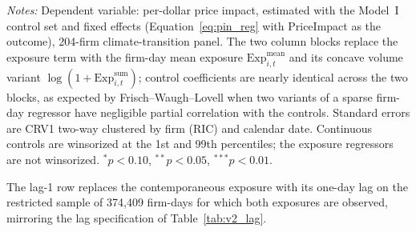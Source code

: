 \begin{table}[htbp]
\begin{threeparttable}
\begin{tablenotes}
\small
\item \textit{Notes:} Dependent variable: per-dollar price impact, estimated with the Model~I control set and fixed effects (Equation~\ref{eq:pin_reg} with PriceImpact as the outcome), 204-firm climate-transition panel. The two column blocks replace the exposure
term with the firm-day mean exposure $\mathrm{Exp}^{\text{mean}}_{i,t}$ and its
concave volume variant $\log(1+\mathrm{Exp}^{\text{sum}}_{i,t})$; control
coefficients are nearly identical across the two blocks, as expected by
Frisch--Waugh--Lovell when two variants of a sparse firm-day regressor have
negligible partial correlation with the controls. Standard errors are CRV1
two-way clustered by firm (RIC) and calendar date. Continuous controls are
winsorized at the 1st and 99th percentiles; the exposure regressors are not
winsorized. $^{*}p<0.10$, $^{**}p<0.05$, $^{***}p<0.01$.
\item[a] The lag-1 row replaces the contemporaneous exposure with its one-day lag on the restricted sample of 374,409 firm-days for which both exposures are observed, mirroring the lag specification of Table~\ref{tab:v2_lag}.
\end{tablenotes}
\end{threeparttable}
\end{table}
